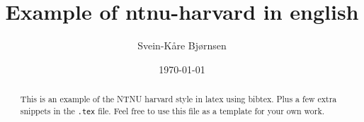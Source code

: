 \documentclass[a4paper, 11pt]{article}
\title{Example of ntnu-harvard in english}
\author{Svein-Kåre Bjørnsen}
\date{\today}
\newcommand{\code}[1]{{\small \texttt{#1}}}  %
\begin{document}
\maketitle

\begin{abstract}
This is an example of the NTNU harvard style in latex using bibtex.
Plus a few extra snippets in the \code{.tex} file. Feel free to use this file as a
template for your own work.
\end{abstract}




\end{document}
